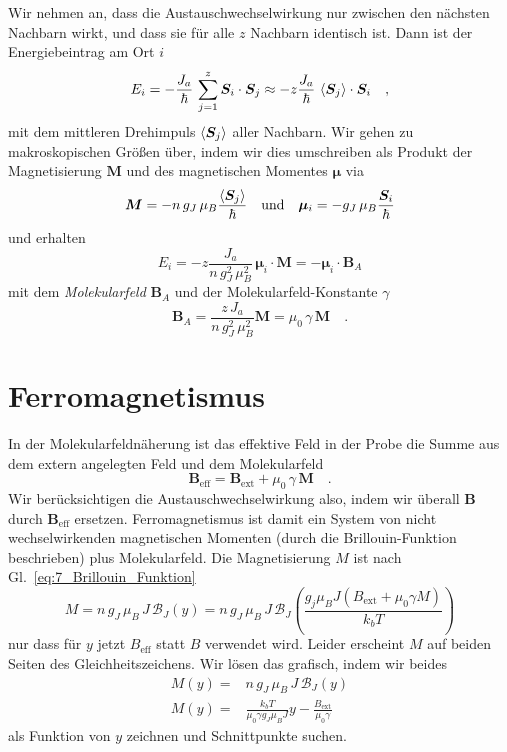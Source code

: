 Wir nehmen an, dass die Austauschwechselwirkung nur zwischen den nächsten Nachbarn wirkt, und dass sie für alle $z$  Nachbarn identisch ist. Dann ist der Energiebeintrag am Ort $i$
\begin{equation}
    E_i = - \frac{J_a}{\hbar} \, \sum_{j=1}^z \bm{S}_i \cdot \bm{S}_j 
    \approx
    - z \frac{J_a}{\hbar} \, \braket{\bm{S}_j} \cdot \bm{S}_i   \quad ,
\end{equation}
mit dem mittleren Drehimpuls $ \braket{\bm{S}_j}$ aller Nachbarn. Wir gehen zu makroskopischen Größen über, indem wir dies umschreiben als Produkt der Magnetisierung $\bm{M}$ und des magnetischen Momentes $\bm{\mu}$ via 
\begin{equation}
    \bm{M} = - n \, g_J \, \mu_B \frac{ \braket{\bm{S}_j}}{\hbar}
    \quad \text{und} \quad
    \bm{\mu}_i = - g_J  \, \mu_B \frac{ \bm{S}_i}{\hbar}
\end{equation}
und erhalten
\begin{equation}
    E_i  = - z \frac{J_a}{n \, g_J^2 \, \mu_B^2} \, \bm{\mu}_i  \cdot \bm{M}  = - \bm{\mu}_i \cdot \bm{B}_A
\end{equation}
mit dem \emph{Molekularfeld} $\bm{B}_A$ und der Molekularfeld-Konstante $\gamma$
\begin{equation}
    \bm{B}_A = \frac{z \, J_a}{n \, g_J^2 \, \mu_B^2} \bm{M} 
   = \mu_0 \, \gamma \, \bm{M}   \quad . 
\end{equation}

\section*{Ferromagnetismus}

In  der Molekularfeldnäherung ist das effektive Feld in der Probe die Summe aus dem extern angelegten Feld und dem Molekularfeld
\begin{equation}
    \bm{B}_\text{eff} = \bm{B}_\text{ext} +  \mu_0 \, \gamma \, \bm{M}  \quad .
\end{equation}
Wir berücksichtigen die Austauschwechselwirkung also, indem wir überall $\bm{B}$ durch $\bm{B}_\text{eff}$ ersetzen. Ferromagnetismus ist damit ein System von nicht wechselwirkenden magnetischen Momenten (durch die Brillouin-Funktion beschrieben) plus Molekularfeld. Die Magnetisierung $M$ ist nach Gl.~\ref{eq:7_Brillouin_Funktion}
\begin{equation}
    M = n \, g_J \, \mu_B \, J \, \mathcal{B}_J(y)
    =  n \, g_J \, \mu_B \, J \, \mathcal{B}_J \left( \frac{g_j \mu_B J (B_\text{ext} + \mu_0 \gamma M)}{k_b T} \right)
\end{equation}
nur dass für $y$ jetzt $B_\text{eff}$ statt $B$ verwendet wird. Leider erscheint $M$ auf beiden Seiten des Gleichheitszeichens. Wir lösen das grafisch, indem wir beides 
\begin{eqnarray}
    M(y) = & n \, g_J \, \mu_B \, J \, \mathcal{B}_J(y)  \label{eq:7_inters1}\\
    M(y) =  & \frac{k_b T}{\mu_0 \gamma g_J \mu_B J} y - \frac{B_\text{ext}}{\mu_0 \gamma}  \label{eq:7_inters2}
\end{eqnarray}
als Funktion von $y$ zeichnen und Schnittpunkte suchen.


